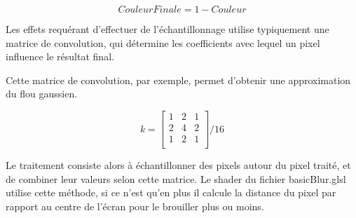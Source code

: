 \documentclass[pdftex, 11pt, a4paper, titlepage]{article}
\begin{document}
\begin{equation*}
CouleurFinale = 1 - Couleur
\end{equation*}

Les effets requérant d'effectuer de l'échantillonnage utilise typiquement
une matrice de convolution, qui détermine les coefficients avec lequel
un pixel influence le résultat final.

Cette matrice de convolution, par exemple, permet d'obtenir une approximation
du flou gaussien.

\begin{equation*}
k =
\begin{bmatrix}
1 & 2 & 1\\
2 & 4 & 2\\
1 & 2 & 1\\
\end{bmatrix}
/ 16
\end{equation*}

Le traitement consiste alors à échantillonner des pixels autour du pixel traité, et de combiner leur valeurs selon cette matrice.
Le shader du fichier basicBlur.glsl utilise cette méthode, si ce n'est qu'en plus
il calcule la distance du pixel par rapport au centre de l'écran pour le brouiller plus
ou moins.
\end{document}
